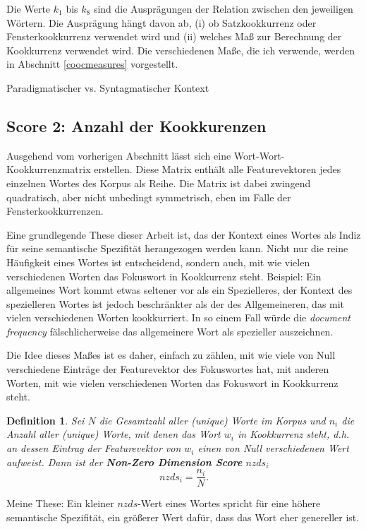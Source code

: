 \documentclass[11pt,numbers=noenddot]{scrartcl}
\newtheorem*{defi}{Definition}
\begin{document}
Die Werte $k_1$ bis $k_8$ sind die Ausprägungen der Relation zwischen den jeweiligen Wörtern. Die Ausprägung hängt davon ab, (i) ob Satzkookkurrenz oder Fensterkookkurrenz verwendet wird und (ii) welches Maß zur Berechnung der Kookkurrenz verwendet wird. Die verschiedenen Maße, die ich verwende, werden in Abschnitt \ref{coocmeasures} vorgestellt.

Paradigmatischer vs. Syntagmatischer Kontext

\subsection{Score 2: Anzahl der Kookkurenzen} \label{nzds}

Ausgehend vom vorherigen Abschnitt lässt sich eine Wort-Wort-Kookkurrenzmatrix erstellen. Diese Matrix enthält alle Featurevektoren jedes einzelnen Wortes des Korpus als Reihe. Die Matrix ist dabei zwingend quadratisch, aber nicht unbedingt symmetrisch, eben im Falle der Fensterkookkurrenzen.

Eine grundlegende These dieser Arbeit ist, das der Kontext eines Wortes als Indiz für seine semantische Spezifität herangezogen werden kann. Nicht nur die reine Häufigkeit eines Wortes ist entscheidend, sondern auch, mit wie vielen verschiedenen Worten das Fokuswort in Kookkurrenz steht. Beispiel: Ein allgemeines Wort kommt etwas seltener vor als ein Spezielleres, der Kontext des spezielleren Wortes ist jedoch beschränkter als der des Allgemeineren, das mit vielen verschiedenen Worten kookkurriert. In so einem Fall würde die \emph{document frequency} fälschlicherweise das allgemeinere Wort als spezieller auszeichnen.

Die Idee dieses Maßes ist es daher, einfach zu zählen, mit wie viele von Null verschiedene Einträge der Featurevektor des Fokuswortes hat, mit anderen Worten, mit wie vielen verschiedenen Worten das Fokuswort in Kookkurrenz steht.

\begin{defi}
Sei $N$ die Gesamtzahl aller (unique) Worte im Korpus und $n_i$ die Anzahl aller (unique) Worte, mit denen das Wort $w_i$ in Kookkurrenz steht, d.h. an dessen Eintrag der Featurevektor von $w_i$ einen von Null verschiedenen Wert aufweist. Dann ist der \textbf{Non-Zero Dimension Score} $nzds_i$
\begin{equation}
    nzds_i = \frac{n_i}{N}.
\end{equation}
\end{defi}

Meine These: Ein kleiner $nzds$-Wert eines Wortes spricht für eine höhere semantische Spezifität, ein größerer Wert dafür, dass das Wort eher genereller ist.
\end{document}
